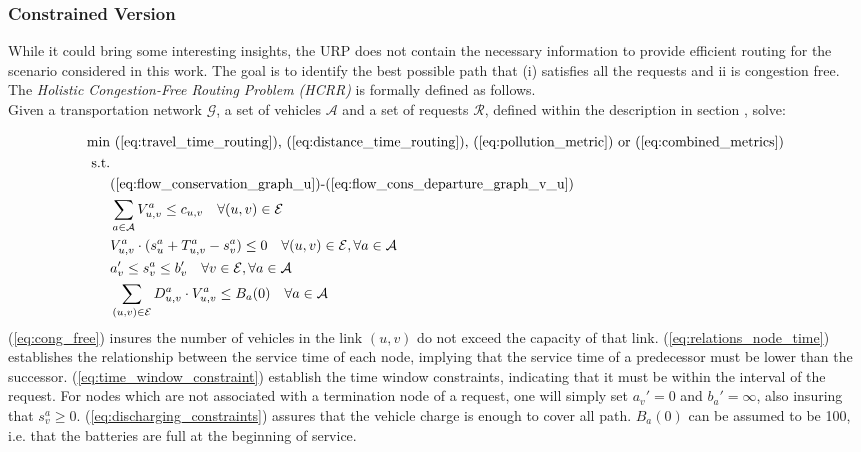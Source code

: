 \subsubsection*{Constrained Version}
While it could bring some interesting insights, the URP does not contain the necessary information to provide efficient routing for the scenario considered in this work. The goal is to identify the best possible path that \textup{(i)} satisfies all the requests and \textup{ii} is congestion free. The \textit{Holistic Congestion-Free Routing Problem (HCRR)} is formally defined as follows.\\ Given a transportation network $\mathcal{G}$, a set of vehicles $\mathcal{A}$ and a set of requests $\mathcal{R}$, defined within the description in section , solve:

\begin{align}
	\text{min}&  \text{
		(\ref{eq:travel_time_routing}), (\ref{eq:distance_time_routing}), (\ref{eq:pollution_metric}) or (\ref{eq:combined_metrics})
	}\nonumber\\
	\text{s.t.} &\nonumber\\
	&\text{(\ref{eq:flow_conservation_graph_u})-(\ref{eq:flow_cons_departure_graph_v_u})}\nonumber\\
	&\sum_{a \in \mathcal{A}}V^a_{u,v} \leq c_{u,v} \quad \forall (u,v) \in \mathcal{E} \label{eq:cong_free}\\
	&V^a_{u,v}\cdot(s_{u}^a + T_{u,v}^a - s_{v}^a) \leq 0 \quad \forall (u,v) \in \mathcal{E}, \forall a \in \mathcal{A}\label{eq:relations_node_time}\\
	&a'_v \leq s_{v}^a \leq b'_v \quad \forall v \in \mathcal{E}, \forall a \in \mathcal{A}\label{eq:time_window_constraint}\\
	&\sum_{(u,v) \in \mathcal{E}}D^a_{u,v}\cdot V^a_{u,v} \leq B_a(0)\quad \forall a \in \mathcal{A} \label{eq:discharging_constraints}
\end{align} 
(\ref{eq:cong_free}) insures the number of vehicles in the link $(u,v)$ do not exceed the capacity of that link. (\ref{eq:relations_node_time}) establishes the relationship between the service time of each node, implying that the service time of a predecessor must be lower than the successor.  (\ref{eq:time_window_constraint}) establish the time window constraints, indicating that it must be within the interval of the request. For nodes which are not associated with a termination node of a  request, one will simply set $a_v' = 0 $ and $b_a' = \infty$, also insuring that $s_v^a \ge 0 $. (\ref{eq:discharging_constraints}) assures that the vehicle charge is enough to cover all path. $B_a(0)$ can be assumed to be 100, i.e. that the batteries are full at the beginning of service. \\
